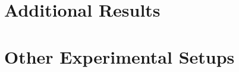 \documentclass{article}
\begin{document}
\newpage
\clearpage

\section{Additional Results}\label{sec:more_results}



\newpage
\clearpage



\newpage
\clearpage



\newpage
\clearpage



\newpage
\clearpage



\newpage
\clearpage



\newpage
\clearpage



\newpage
\clearpage



\newpage
\clearpage



\newpage
\clearpage



\section{Other Experimental Setups}





\newpage
\clearpage



\newpage
\clearpage







% 
\end{document}
